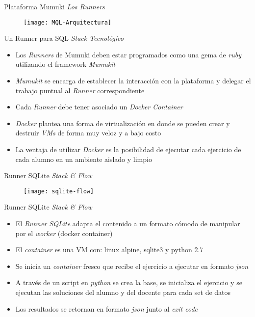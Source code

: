 \documentclass{beamer}
\begin{document}
\begin{frame}
    {Plataforma Mumuki}
    {\emph{Los Runners}}

    \vspace{-.9em}
    \begin{figure}[h]
        \texttt{[image: MQL-Arquitectura]}
    \end{figure}
\end{frame}


\begin{frame}
    {Un Runner para SQL}
    {\emph{Stack Tecnológico}}

    \begin{itemize}
        \item Los \emph{Runners} de Mumuki deben estar programados
        como una gema de \emph{ruby} utilizando el framework \emph{Mumukit}
        \item \emph{Mumukit} se encarga de establecer la interacción con
        la plataforma y delegar el trabajo puntual al \emph{Runner} correspondiente
        \item Cada \emph{Runner} debe tener asociado un \emph{Docker Container}
        \item \emph{Docker} plantea una forma de virtualización en donde
        se pueden crear y destruir \emph{VMs} de forma muy veloz y a bajo costo
        \item La ventaja de utilizar \emph{Docker} es la posibilidad
        de ejecutar cada ejercicio de cada alumno en un ambiente
        aislado y limpio
    \end{itemize}
\end{frame}

\begin{frame}
    {Runner SQLite}
    {\emph{Stack \& Flow}}

    \begin{figure}[h]
        \texttt{[image: sqlite-flow]}
    \end{figure}
\end{frame}

\begin{frame}
    {Runner SQLite}
    {\emph{Stack \& Flow}}

    \begin{itemize}
        \item El \emph{Runner SQLite} adapta el contenido a un formato
        cómodo de manipular por el \emph{worker} (docker container)
        \item El \emph{container} es una VM con: {\footnotesize linux alpine, sqlite3 y python 2.7}
        \item Se inicia un \emph{container} fresco que recibe el ejercicio
        a ejecutar en formato \emph{json}
        \item A través de un script en \emph{python} se crea la base, se inicializa
        el ejercicio y se ejecutan las soluciones del alumno y del docente
        para cada set de datos
        \item Los resultados se retornan en formato \emph{json} junto al
        \emph{exit code}
    \end{itemize}

\end{frame}
\end{document}

